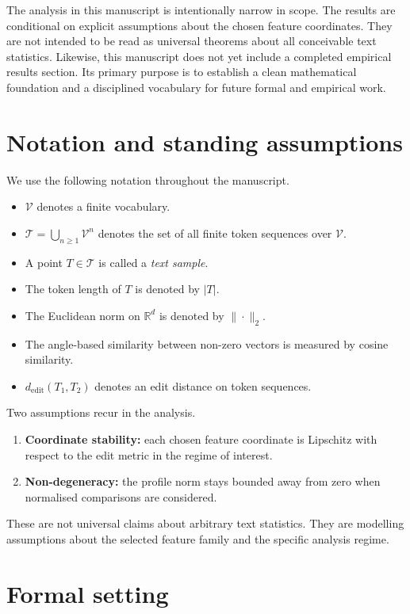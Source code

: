 \documentclass[11pt]{article}
\begin{document}
The analysis in this manuscript is intentionally narrow in scope. The results are conditional on explicit assumptions about the chosen feature coordinates. They are not intended to be read as universal theorems about all conceivable text statistics. Likewise, this manuscript does not yet include a completed empirical results section. Its primary purpose is to establish a clean mathematical foundation and a disciplined vocabulary for future formal and empirical work.

\section{Notation and standing assumptions}

We use the following notation throughout the manuscript.
\begin{itemize}
    \item $\mathcal{V}$ denotes a finite vocabulary.
    \item $\mathcal{T} = \bigcup_{n \geq 1} \mathcal{V}^n$ denotes the set of all finite token sequences over $\mathcal{V}$.
    \item A point $T \in \mathcal{T}$ is called a \emph{text sample}.
    \item The token length of $T$ is denoted by $|T|$.
    \item The Euclidean norm on $\mathbb{R}^d$ is denoted by $\|\cdot\|_2$.
    \item The angle-based similarity between non-zero vectors is measured by cosine similarity.
    \item $d_{\mathrm{edit}}(T_1,T_2)$ denotes an edit distance on token sequences.
\end{itemize}

Two assumptions recur in the analysis.
\begin{enumerate}[label=(A\arabic*)]
    \item \textbf{Coordinate stability:} each chosen feature coordinate is Lipschitz with respect to the edit metric in the regime of interest.
    \item \textbf{Non-degeneracy:} the profile norm stays bounded away from zero when normalised comparisons are considered.
\end{enumerate}

These are not universal claims about arbitrary text statistics. They are modelling assumptions about the selected feature family and the specific analysis regime.

\section{Formal setting}
\end{document}
